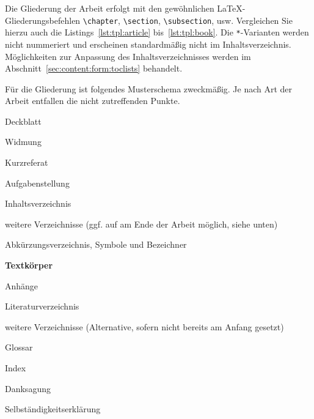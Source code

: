 Die Gliederung der Arbeit erfolgt mit den gewöhnlichen
\LaTeX-Gliederungsbefehlen \verb+\chapter+, \verb+\section+,
\verb+\subsection+, usw. Vergleichen Sie hierzu auch die
Listings~\ref{lst:tpl:article} bis~\ref{lst:tpl:book}. Die \texttt{*}-Varianten
werden nicht nummeriert und erscheinen standardmäßig nicht im
Inhaltsverzeichnis. Möglichkeiten zur Anpassung des Inhaltsverzeichnisses
werden im Abschnitt~\ref{sec:content:form:toclists} behandelt.

Für die Gliederung ist folgendes Musterschema zweckmäßig. Je nach Art der
Arbeit entfallen die nicht zutreffenden Punkte.

\begin{compactitem}
\item Deckblatt
\item Widmung
\item Kurzreferat
\item Aufgabenstellung
\item Inhaltsverzeichnis
\item weitere Verzeichnisse
      (ggf. auf am Ende der Arbeit möglich, siehe unten)
\item Abkürzungsverzeichnis, Symbole und Bezeichner
\item \textbf{Textkörper}
\item Anhänge
\item Literaturverzeichnis
\item weitere Verzeichnisse
      (Alternative, sofern nicht bereits am Anfang gesetzt)
\item Glossar
\item Index
\item Danksagung
\item Selbständigkeitserklärung
\end{compactitem}
